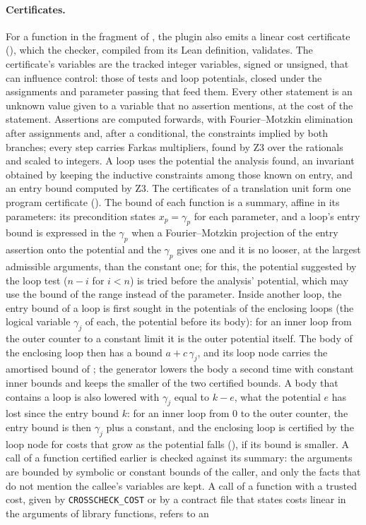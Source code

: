 \documentclass[oneside,english]{amsart}
\numberwithin{equation}{section}
\numberwithin{figure}{section}
\theoremstyle{plain}
\theoremstyle{definition}
\theoremstyle{plain}
\theoremstyle{remark}
\theoremstyle{plain}
\theoremstyle{definition}
\theoremstyle{plain}
\theoremstyle{remark}
\begin{document}
\paragraph{Certificates.}
For a function in the fragment of \cite[Section~\ref{I-subsec:checker}]{crosscheckTheory}, the plugin also emits a linear cost certificate (\cite[Definition~\ref{I-def:certificate}]{crosscheckTheory}), which the checker, compiled from its Lean definition, validates. The certificate's variables are the tracked integer variables, signed or unsigned, that can influence control: those of tests and loop potentials, closed under the assignments and parameter passing that feed them. Every other statement is an unknown value given to a variable that no assertion mentions, at the cost of the statement. Assertions are computed forwards, with Fourier--Motzkin elimination after assignments and, after a conditional, the constraints implied by both branches; every step carries Farkas multipliers, found by Z3 over the rationals and scaled to integers. A loop uses the potential the analysis found, an invariant obtained by keeping the inductive constraints among those known on entry, and an entry bound computed by Z3. The certificates of a translation unit form one program certificate (\cite[Definition~\ref{I-def:program-certificate}]{crosscheckTheory}). The bound of each function is a summary, affine in its parameters: its precondition states $x_p = \gamma_p$ for each parameter, and a loop's entry bound is expressed in the $\gamma_p$ when a Fourier--Motzkin projection of the entry assertion onto the potential and the $\gamma_p$ gives one and it is no looser, at the largest admissible arguments, than the constant one; for this, the potential suggested by the loop test ($n - i$ for $i < n$) is tried before the analysis' potential, which may use the bound of the range instead of the parameter. Inside another loop, the entry bound of a loop is first sought in the potentials of the enclosing loops (the logical variable $\gamma_j$ of each, the potential before its body): for an inner loop from the outer counter to a constant limit it is the outer potential itself. The body of the enclosing loop then has a bound $a + c\,\gamma_j$, and its loop node carries the amortised bound of \cite[Proposition~\ref{I-prop:amortised-loop}]{crosscheckTheory}; the generator lowers the body a second time with constant inner bounds and keeps the smaller of the two certified bounds. A body that contains a loop is also lowered with $\gamma_j$ equal to $k - e$, what the potential $e$ has lost since the entry bound $k$: for an inner loop from $0$ to the outer counter, the entry bound is then $\gamma_j$ plus a constant, and the enclosing loop is certified by the loop node for costs that grow as the potential falls (\cite[Proposition~\ref{I-prop:amortised-loop}(2)]{crosscheckTheory}), if its bound is smaller. A call of a function certified earlier is checked against its summary: the arguments are bounded by symbolic or constant bounds of the caller, and only the facts that do not mention the callee's variables are kept. A call of a function with a trusted cost, given by \texttt{CROSSCHECK\_COST} or by a contract file that states costs linear in the arguments of library functions, refers to an 
\end{document}
